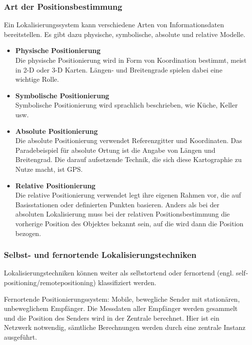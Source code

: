 \begin{itemize}
    \subsubsection{Art der Positionsbestimmung}

    Ein Lokalisierungssystem kann verschiedene Arten von Informationsdaten bereitstellen. Es gibt dazu physische, symbolische, absolute und relative Modelle.

      \begin{itemize}
        \item \textbf{Physische Positionierung}\\
        Die physische Positionierung wird in Form von Koordination bestimmt, meist in 2-D oder 3-D Karten. Längen- und Breitengrade spielen dabei eine wichtige Rolle.
        \item \textbf{Symbolische Positionierung}\\
        Symbolische Positionierung wird sprachlich beschrieben, wie \zB Küche, Keller usw.
        \item \textbf{Absolute Positionierung}\\
        Die absolute Positionierung verwendet Referenzgitter und Koordinaten. Das Paradebeispiel für absolute Ortung ist die Angabe von Längen­ und Breitengrad.
        Die darauf aufsetzende Technik, die sich diese Kartographie zu Nutze macht, ist GPS.
        \item \textbf{Relative Positionierung}\\
        Die relative Positionierung verwendet legt ihre eigenen Rahmen vor, die auf Basisstationen oder definierten Punkten basieren.
        Anders als bei der absoluten Lokalisierung muss bei der relativen Positionsbestimmung die vorherige Position des Objektes bekannt sein, auf die wird dann die Position bezogen.
      \end{itemize}


    \subsubsection{Selbst- und fernortende Lokalisierungstechniken}

    Lokalisierungstechniken können weiter als selbstortend oder fernortend (engl. self­positioning/remote­positioning) klassifiziert werden.

    Fernortende Positionierungssystem: Mobile, bewegliche Sender mit stationären, unbeweglichem Empfänger. Die Messdaten aller Empfänger werden gesammelt und die
    Position des Senders wird in der Zentrale berechnet. Hier ist ein Netzwerk notwendig, sämtliche Berechnungen werden durch eine zentrale Instanz ausgeführt.


\end{itemize}

